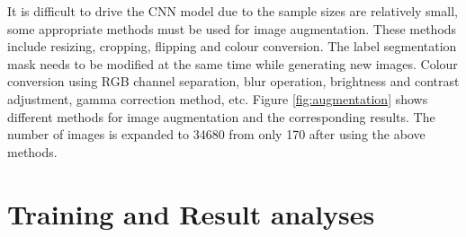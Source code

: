 \documentclass[10pt, a4paper]{article}
\begin{document}
\begin{multicols}{2}
	\par
	It is difficult to drive the CNN model due to the sample sizes are relatively small, some appropriate methods must be used for image augmentation. These methods include resizing, cropping, flipping and colour conversion. The label segmentation mask needs to be modified at the same time while generating new images. Colour conversion using RGB channel separation, blur operation, brightness and contrast adjustment, gamma correction method, etc. Figure \ref{fig:augmentation} shows different methods for image augmentation and the corresponding results. The number of images is expanded to 34680 from only 170 after using the above methods.

	\section{Training and Result analyses } \justify
	
	

\end{multicols}
\end{document}
